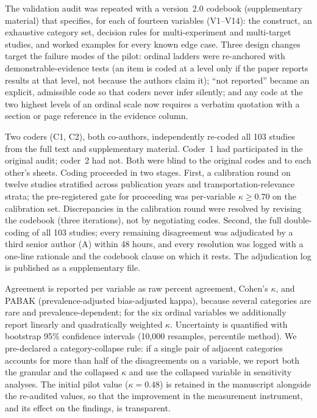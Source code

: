 The validation audit was repeated with a version~2.0 codebook
(supplementary material) that specifies, for each of fourteen variables
(V1--V14): the construct, an exhaustive category set, decision rules
for multi-experiment and multi-target studies, and worked examples for
every known edge case. Three design changes target the failure modes of
the pilot: ordinal ladders were re-anchored with demonstrable-evidence
tests (an item is coded at a level only if the paper reports results at
that level, not because the authors claim it); ``not reported'' became
an explicit, admissible code so that coders never infer silently; and
any code at the two highest levels of an ordinal scale now requires a
verbatim quotation with a section or page reference in the evidence
column.

Two coders (C1, C2), both co-authors, independently re-coded all 103
studies from the full text and supplementary material. Coder~1 had
participated in the original audit; coder~2 had not. Both were blind to
the original codes and to each other's sheets. Coding proceeded in two
stages. First, a calibration round on twelve studies stratified across
publication years and transportation-relevance strata; the
pre-registered gate for proceeding was per-variable $\kappa \geq 0.70$
on the calibration set. Discrepancies in the calibration round were
resolved by revising the codebook (three iterations), not by
negotiating codes. Second, the full double-coding of all 103 studies;
every remaining disagreement was adjudicated by a third senior author
(A) within 48 hours, and every resolution was logged with a one-line
rationale and the codebook clause on which it rests. The adjudication
log is published as a supplementary file.

Agreement is reported per variable as raw percent agreement, Cohen's
$\kappa$, and PABAK (prevalence-adjusted bias-adjusted kappa), because
several categories are rare and prevalence-dependent; for the six
ordinal variables we additionally report linearly and quadratically
weighted $\kappa$. Uncertainty is quantified with bootstrap 95\%
confidence intervals (10{,}000 resamples, percentile method). We
pre-declared a category-collapse rule: if a single pair of adjacent
categories accounts for more than half of the disagreements on a
variable, we report both the granular and the collapsed $\kappa$ and
use the collapsed variable in sensitivity analyses. The initial pilot
value ($\kappa = 0.48$) is retained in the manuscript alongside the
re-audited values, so that the improvement in the measurement
instrument, and its effect on the findings, is transparent.

